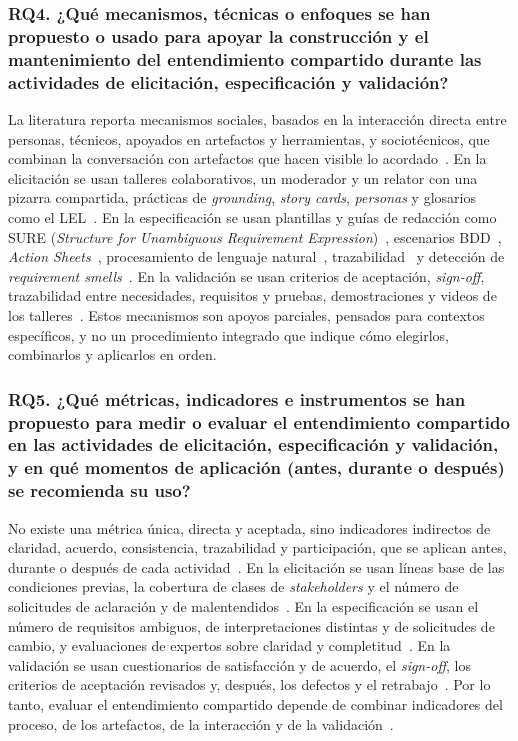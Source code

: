 \documentclass[12pt,letterpaper,oneside]{report}
\begin{document}
\subsubsection{RQ4. ¿Qué mecanismos, técnicas o enfoques se han propuesto o
usado para apoyar la construcción y el mantenimiento del entendimiento
compartido durante las actividades de elicitación, especificación y validación?}
La literatura reporta mecanismos sociales, basados en la interacción directa
entre personas, técnicos, apoyados en artefactos y herramientas, y
sociotécnicos, que combinan la conversación con artefactos que hacen visible lo
acordado~\cite{balasubramaniam2023}. En la elicitación se usan talleres
colaborativos, un moderador y un relator con una pizarra compartida, prácticas
de \textit{grounding}, \textit{story cards}, \textit{personas} y glosarios como
el
LEL~\cite{martins2019,calefato2015,devries2023,wang2025personas,antonelli2016}.
En la especificación se usan plantillas y guías de redacción como SURE (\textit{Structure for Unambiguous Requirement
Expression})~\cite{parrales2024}, escenarios BDD~\cite{irshad2021bdd}, \textit{Action
Sheets}~\cite{kunz2016}, procesamiento de lenguaje natural~\cite{ali2019},
trazabilidad~\cite{behutiye2022quality} y detección de \textit{requirement
smells}~\cite{gentili2025}. En la validación se usan criterios de aceptación,
\textit{sign-off}, trazabilidad entre necesidades, requisitos y pruebas,
demostraciones y videos de los
talleres~\cite{laporte2023,pacheco2022,okpara2023,fricker2015,kosenkov2026}.
Estos mecanismos son apoyos parciales, pensados para contextos específicos, y
no un procedimiento integrado que indique cómo elegirlos, combinarlos y
aplicarlos en orden.

\subsubsection{RQ5. ¿Qué métricas, indicadores e instrumentos se han propuesto
para medir o evaluar el entendimiento compartido en las actividades de
elicitación, especificación y validación, y en qué momentos de aplicación
(antes, durante o después) se recomienda su uso?}
No existe una métrica única, directa y aceptada, sino indicadores indirectos
de claridad, acuerdo, consistencia, trazabilidad y participación, que se
aplican antes, durante o después de cada
actividad~\cite{balasubramaniam2023,parrales2024,pacheco2022}. En la
elicitación se usan líneas base de las condiciones previas, la cobertura de
clases de \textit{stakeholders} y el número de solicitudes de aclaración y de
malentendidos~\cite{calefato2015,pacheco2022}. En la especificación se usan el
número de requisitos ambiguos, de interpretaciones distintas y de solicitudes de
cambio, y evaluaciones de expertos sobre claridad y
completitud~\cite{gentili2025,laporte2023,irshad2021bdd}. En la validación se
usan cuestionarios de satisfacción y de acuerdo, el \textit{sign-off}, los
criterios de aceptación revisados y, después, los defectos y el
retrabajo~\cite{calefato2015,laporte2023,gentili2025}. Por lo tanto, evaluar el
entendimiento compartido depende de combinar indicadores del proceso, de los
artefactos, de la interacción y de la validación~\cite{fricker2015}.
\end{document}
